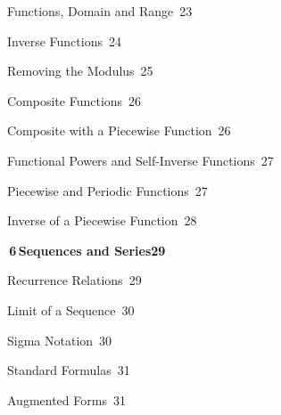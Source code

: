 \documentclass[a4paper,openany]{book}
\begin{document}
{\noindent{}\quad Functions, Domain and Range\dotfill\ 23\par
\noindent{}\quad Inverse Functions\dotfill\ 24\par
\noindent{}\quad Removing the Modulus\dotfill\ 25\par
\noindent{}\quad Composite Functions\dotfill\ 26\par
\noindent{}\quad Composite with a Piecewise Function\dotfill\ 26\par
\noindent{}\quad Functional Powers and Self-Inverse Functions\dotfill\ 27\par
\noindent{}\quad Piecewise and Periodic Functions\dotfill\ 27\par
\noindent{}\quad Inverse of a Piecewise Function\dotfill\ 28\par
\medskip\noindent\colorbox{blue!8}{\parbox{\dimexpr\textwidth-2\fboxsep}{\large\bfseries\color{blue!50!black}\colorbox{blue!50!black}{\color{white}\,6\,}\quad Sequences and Series\hfill 29}}\par\nopagebreak\smallskip\nopagebreak
\noindent{}\quad Recurrence Relations\dotfill\ 29\par
\noindent{}\quad Limit of a Sequence\dotfill\ 30\par
\noindent{}\quad Sigma Notation\dotfill\ 30\par
\noindent{}\quad Standard Formulas\dotfill\ 31\par
\noindent{}\quad Augmented Forms\dotfill\ 31\par
}
\end{document}
